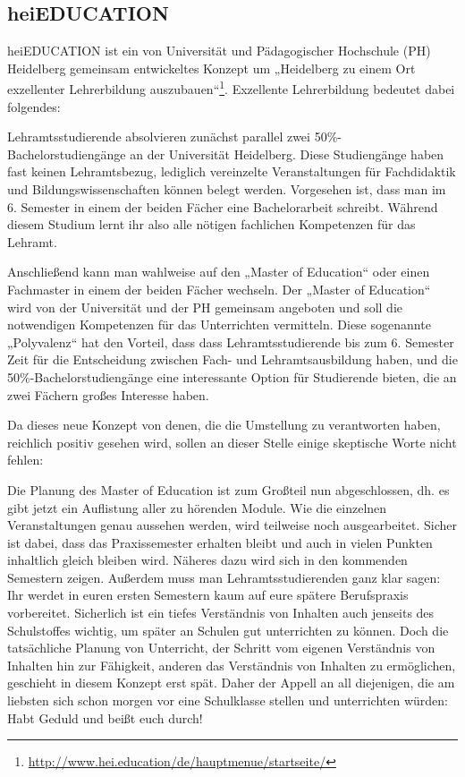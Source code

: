 \subsection{heiEDUCATION}

heiEDUCATION ist ein von Universität und Pädagogischer Hochschule (PH) Heidelberg gemeinsam entwickeltes Konzept um „Heidelberg zu einem Ort exzellenter Lehrerbildung auszubauen“\footnote{\url{http://www.hei.education/de/hauptmenue/startseite/}}. Exzellente Lehrerbildung bedeutet dabei folgendes:

Lehramtsstudierende absolvieren zunächst parallel zwei 50\%-Ba\-che\-lor\-stu\-di\-en\-gän\-ge an der Universität Heidelberg. Diese Studiengänge haben fast keinen Lehramtsbezug, lediglich vereinzelte Veranstaltungen für Fachdidaktik und Bildungswissenschaften können belegt werden. Vorgesehen ist, dass man im 6. Semester in einem der beiden Fächer eine Bachelorarbeit schreibt. Während diesem Studium lernt ihr also alle nötigen fachlichen Kompetenzen für das Lehramt.

Anschließend kann man wahlweise auf den „Master of Education“ oder einen Fachmaster in einem der beiden Fächer wechseln. Der „Master of Education“ wird von der Universität und der PH gemeinsam angeboten und soll die notwendigen Kompetenzen für das Unterrichten vermitteln. Diese sogenannte „Polyvalenz“ hat den Vorteil, dass dass Lehramtsstudierende bis zum 6. Semester Zeit für die Entscheidung zwischen Fach- und Lehramtsausbildung haben, und die 50\%-Bachelorstudiengänge eine interessante Option für Studierende bieten, die an zwei Fächern großes Interesse haben.

Da dieses neue Konzept von denen, die die Umstellung zu verantworten haben, reichlich positiv gesehen wird, sollen an dieser Stelle einige skeptische Worte nicht fehlen:

Die Planung des Master of Education ist zum Großteil nun abgeschlossen, dh. es gibt jetzt ein Auflistung aller zu hörenden Module. Wie die einzelnen Veranstaltungen genau aussehen werden, wird teilweise noch ausgearbeitet. Sicher ist dabei, dass das Praxissemester erhalten bleibt und auch in vielen Punkten inhaltlich gleich bleiben wird. Näheres dazu wird sich in den kommenden Semestern zeigen. Außerdem muss man Lehramtsstudierenden ganz klar sagen: Ihr werdet in euren ersten Semestern kaum auf eure spätere Berufspraxis vorbereitet. Sicherlich ist ein tiefes Verständnis von Inhalten auch jenseits des Schulstoffes wichtig, um später an Schulen gut unterrichten zu können. Doch die tatsächliche Planung von Unterricht, der Schritt vom eigenen Verständnis von Inhalten hin zur Fähigkeit, anderen das Verständnis von Inhalten zu ermöglichen, geschieht in diesem Konzept erst spät. Daher der Appell an all diejenigen, die am liebsten sich schon morgen vor eine Schulklasse stellen und unterrichten würden: Habt Geduld und beißt euch durch!

